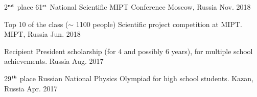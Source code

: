 \begin{cvhonors}
  \cvhonor
    {2$^{\textbf{\tiny nd}}$ place} %
    {61$^{\texttt{\tiny st}}$ National Scientific MIPT Conference} %
    {Moscow, Russia} %
    {Nov. 2018} %
    
  \cvhonor
    {Top 10 of the class ($\sim$ 1100 people)} %
    {Scientific project competition at MIPT.} %
    {MIPT, Russia} %
    {Jun. 2018} %
    
  \cvhonor
    {Recipient} %
    {President scholarship (for 4 and possibly 6 years), for multiple school achievements.} %
    {Russia} %
    {Aug. 2017} %

  \cvhonor
    {29$^{\textbf{\tiny th}}$ place} %
    {Russian National Physics Olympiad for high school students.} %
    {Kazan, Russia} %
    {Apr. 2017} %
	
\end{cvhonors}
